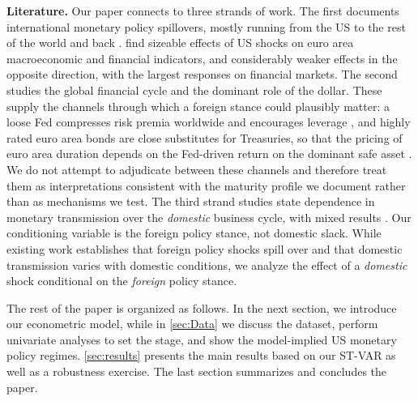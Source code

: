 \textbf{Literature. } Our paper connects to three strands of work. The first documents international monetary policy spillovers, mostly running from the US to the rest of the world and back \citep{kim2001international, canova2005transmission, bluwstein2018beggar, crespo2019spillovers, ca2020monetary, breitenlechner2021spillbacks, ca2021making, gj2023global}. \cite{ca2021making} find sizeable effects of US shocks on euro area macroeconomic and financial indicators, and considerably weaker effects in the opposite direction, with the largest responses on financial markets. The second studies the global financial cycle and the dominant role of the dollar. These supply the channels through which a foreign stance could plausibly matter: a loose Fed compresses risk premia worldwide and encourages leverage \citep{miranda2020us}, and highly rated euro area bonds are close substitutes for Treasuries, so that the pricing of euro area duration depends on the Fed-driven return on the dominant safe asset \citep{gopinath2021dominant}. We do not attempt to adjudicate between these channels and therefore treat them as interpretations consistent with the maturity profile we document rather than as mechanisms we test. The third strand studies state dependence in monetary transmission over the \textit{domestic} business cycle, with mixed results \citep[see, e.g.,][]{tenreyro2016pushing}. Our conditioning variable is the foreign policy stance, not domestic slack. While existing work establishes that foreign policy shocks spill over and that domestic transmission varies with domestic conditions, we analyze the effect of a \textit{domestic} shock conditional on the \textit{foreign} policy stance.

The rest of the paper is organized as follows. In the next section, we introduce our econometric model, while in \autoref{sec:Data} we discuss the dataset, perform univariate analyses to set the stage, and show the model-implied US monetary policy regimes.  \autoref{sec:results} presents the main results based on our ST-VAR as well as a robustness exercise. The last section summarizes and concludes the paper.
